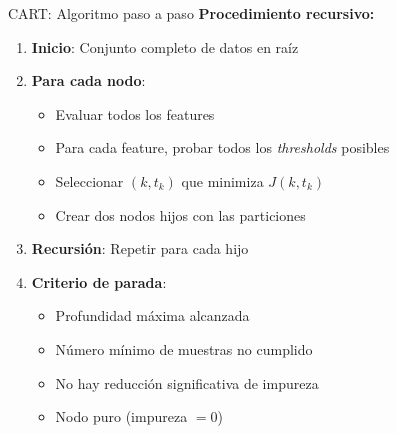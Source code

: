\documentclass[aspectratio=169,12pt]{beamer}
\begin{document}
\begin{frame}{CART: Algoritmo paso a paso}
  \small
  \textbf{Procedimiento recursivo:}
  \begin{enumerate}
    \item \textbf{Inicio}: Conjunto completo de datos en raíz
    \item \textbf{Para cada nodo}:
    \begin{itemize}
      \item Evaluar todos los features
      \item Para cada feature, probar todos los \emph{thresholds} posibles
      \item Seleccionar $(k, t_k)$ que minimiza $J(k, t_k)$
      \item Crear dos nodos hijos con las particiones
    \end{itemize}
    \item \textbf{Recursión}: Repetir para cada hijo
    \item \textbf{Criterio de parada}:
    \begin{itemize}
      \item Profundidad máxima alcanzada
      \item Número mínimo de muestras no cumplido
      \item No hay reducción significativa de impureza
      \item Nodo puro (impureza $= 0$)
    \end{itemize}
  \end{enumerate}
\end{frame}
\end{document}
